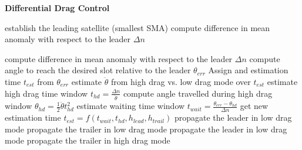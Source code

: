 \begin{algorithm}[H]
      \caption{\textbf{Differential Drag Control}}
      \begin{algorithmic}[1]
                  \State establish the leading satellite (smallest SMA)
                  \State compute difference in mean anomaly with respect to the leader $\Delta n$
                                        
                              \State compute difference in mean anomaly with respect to the leader $\Delta n$
                              \State compute angle to reach the desired slot relative to the leader $\theta_{err}$
                              \State Assign and estimation time $t_{est}$ from $\theta_{err}$
                              \State estimate $\ddot{\theta}$ from high drag vs. low drag mode over $t_{est}$
                              \State estimate high drag time window $t_{hd} = \frac{\Delta n}{\ddot{\theta}}$
                              \State compute angle travelled during high drag window $\theta_{hd} = \frac{1}{2}\ddot{\theta}t_{hd}^2$
                              \State estimate waiting time window $t_{wait} = \frac{\theta_{err} - \theta_{hd}}{\Delta n}$
                              \State get new estimation time $t_{est} = f(t_{wait}, t_{hd}, h_{lead}, h_{trail})$ 
                        \EndFor
                              \State propagate the leader in low drag mode
                              \State propagate the trailer in low drag mode
                        \EndFor
                              \State propagate the leader in low drag mode
                              \State propagate the trailer in high drag mode
                        \EndFor
                  \EndFor
            \EndProcedure
      \end{algorithmic}
\end{algorithm}


